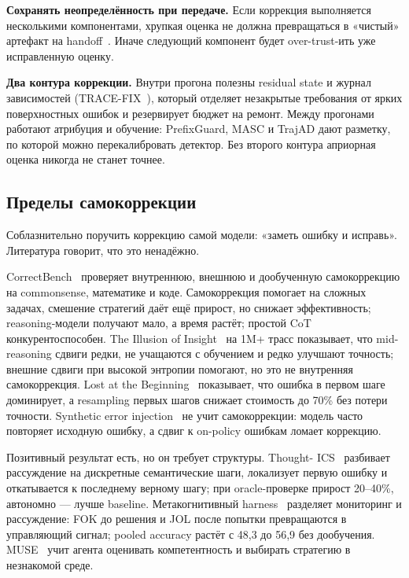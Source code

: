 \documentclass[11pt,a4paper]{article}
\begin{document}
\textbf{Сохранять неопределённость при передаче.}
Если коррекция выполняется несколькими компонентами, хрупкая оценка не
должна превращаться в «чистый» артефакт на handoff~\cite{shi2026laundering}.
Иначе следующий компонент будет over-trust-ить уже исправленную оценку.

\textbf{Два контура коррекции.}
Внутри прогона полезны residual state и журнал зависимостей
(TRACE-FIX~\cite{huang2026tracefix}), который отделяет незакрытые
требования от ярких поверхностных ошибок и резервирует бюджет на ремонт.
Между прогонами работают атрибуция и обучение: PrefixGuard, MASC и TrajAD
дают разметку, по которой можно перекалибровать детектор. Без второго
контура априорная оценка никогда не станет точнее.

\subsection{Пределы самокоррекции}

Соблазнительно поручить коррекцию самой модели: «заметь ошибку и исправь».
Литература говорит, что это ненадёжно.

CorrectBench~\cite{tie2025correctbench} проверяет внутреннюю, внешнюю и
дообученную самокоррекцию на commonsense, математике и коде. Самокоррекция
помогает на сложных задачах, смешение стратегий даёт ещё прирост, но
снижает эффективность; reasoning-модели получают мало, а время растёт;
простой CoT конкурентоспособен. The Illusion of
Insight~\cite{daliberti2026illusion} на 1M+ трасс показывает, что
mid-reasoning сдвиги редки, не учащаются с обучением и редко улучшают
точность; внешние сдвиги при высокой энтропии помогают, но это не
внутренняя самокоррекция. Lost at the Beginning~\cite{liao2025lost}
показывает, что ошибка в первом шаге доминирует, а resampling первых шагов
снижает стоимость до 70\% без потери точности. Synthetic error
injection~\cite{wu2025synthetic} не учит самокоррекции: модель часто
повторяет исходную ошибку, а сдвиг к on-policy ошибкам ломает коррекцию.

Позитивный результат есть, но он требует структуры. Thought-
ICS~\cite{samanta2026thoughtics} разбивает рассуждение на дискретные
семантические шаги, локализует первую ошибку и откатывается к последнему
верному шагу; при oracle-проверке прирост 20--40\%, автономно — лучше
baseline. Метакогнитивный harness~\cite{cao2026metacognitive} разделяет
мониторинг и рассуждение: FOK до решения и JOL после попытки превращаются
в управляющий сигнал; pooled accuracy растёт с 48{,}3 до 56{,}9 без
дообучения. MUSE~\cite{valiente2024muse} учит агента оценивать
компетентность и выбирать стратегию в незнакомой среде.
\end{document}
